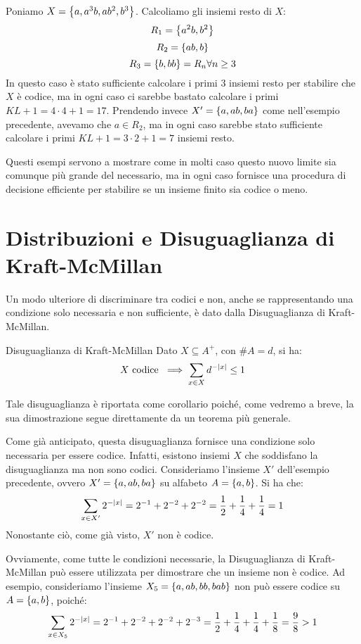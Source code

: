 \begin{example}{}
  Poniamo \(X = \set{a,a^3b,ab^2,b^3}\). Calcoliamo gli insiemi resto di \(X\):
  \[R_1 = \set{a^2b,b^2}\]
  \[R_2 = \set{ab,b}\]
  \[R_3 = \set{b,bb} = R_n \forall n \geq 3\]
  In questo caso è stato sufficiente calcolare i primi \(3\) insiemi resto per stabilire che \(X\) è codice, ma in ogni caso ci sarebbe bastato calcolare i primi \(KL+1 = 4\cdot 4 + 1 = 17\).
  Prendendo invece \(X' = \set{a,ab,ba}\) come nell'esempio precedente, avevamo che \(a \in R_2\), ma in ogni caso sarebbe stato sufficiente calcolare i primi \(KL+1 = 3\cdot 2 + 1 = 7\) insiemi resto.
\end{example}

Questi esempi servono a mostrare come in molti caso questo nuovo limite sia comunque più grande del necessario, ma in ogni caso fornisce una procedura di decisione efficiente per stabilire se un insieme finito sia codice o meno.

\section{Distribuzioni e Disuguaglianza di Kraft-McMillan}

Un modo ulteriore di discriminare tra codici e non, anche se rappresentando una condizione solo necessaria e non sufficiente, è dato dalla Disuguaglianza di Kraft-McMillan.
\begin{corollary}[label=cor:kraft-mcmillan_inequality]{Disuguaglianza di Kraft-McMillan}
  Dato \(X \subseteq A^+\), con \(\# A = d\), si ha:
    \[X \text{ codice } \implies \sum_{x \in X} d^{-\left|x\right|} \leq 1\]
\end{corollary}

Tale disuguaglianza è riportata come corollario poiché, come vedremo a breve, la sua dimostrazione segue direttamente da un teorema più generale.

\begin{example}[label=ex:kraft-mcmillan]{}
  Come già anticipato, questa disuguaglianza fornisce una condizione solo necessaria per essere codice. Infatti, esistono insiemi \(X\) che soddisfano la disuguaglianza ma non sono codici.
  Consideriamo l'insieme \(X'\) dell'esempio precedente, ovvero \(X' = \set{a,ab,ba}\) su alfabeto \(A = \set{a,b}\).
  Si ha che:
  \[\sum_{x \in X'} 2^{-\left|x\right|}= 2^{-1} + 2^{-2} + 2^{-2} = \frac{1}{2} + \frac{1}{4} + \frac{1}{4} = 1\]
  Nonostante ciò, come già visto, \(X'\) non è codice.
  
  Ovviamente, come tutte le condizioni necessarie, la Disuguaglianza di Kraft-McMillan può essere utilizzata per dimostrare che un insieme non è codice.
  Ad esempio, consideriamo l'insieme \(X_5 = \set{a,ab,bb,bab}\) non può essere codice su \(A = \set{a,b}\), poiché:
  \[\sum_{x \in X_5} 2^{-\left|x\right|}= 2^{-1} + 2^{-2} + 2^{-2} + 2^{-3} = \frac{1}{2} + \frac{1}{4} + \frac{1}{4} + \frac{1}{8} = \frac{9}{8} > 1\]
\end{example}

